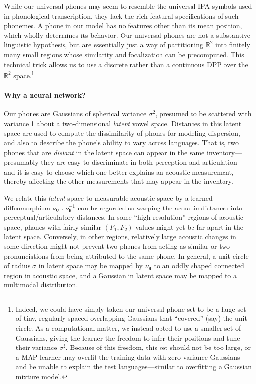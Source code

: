 \documentclass[11pt,a4paper]{article}
\newcommand{\vtheta}{{\boldsymbol \theta}}
\newcommand{\NN}{\nu_{\vtheta}}
\begin{document}
While our universal phones may seem to resemble the universal IPA
symbols used in phonological transcription, they lack the rich
featural specifications of such phonemes.  A phone in our model has no
features other than its mean position, which wholly determines its
behavior.  Our universal phones are not a substantive linguistic
hypothesis, but are essentially just a way of partitioning
$\mathbb{R}^2$ into finitely many small regions whose similarity and
focalization can be precomputed.  This technical trick allows us to
use a discrete rather than a continuous DPP over the
$\mathbb{R}^2$ space.\footnote{\label{fn:overfit}Indeed, we could have
  simply taken our universal phone set to be a huge set of tiny,
  regularly spaced overlapping Gaussians that ``covered'' (say) the
  unit circle.  As a computational matter, we instead opted to use a
  smaller set of Gaussians, giving the learner the freedom to infer
  their positions and tune their variance $\sigma^2$.  Because of this
  freedom, this set should not be too large, or a MAP learner may
  overfit the training data with zero-variance Gaussians and be unable
  to explain the test languages---similar to overfitting a Gaussian
  mixture model.}

\paragraph{Why a neural network?}
Our phones are Gaussians of spherical variance $\sigma^2$, presumed to
be scattered with variance 1 about a two-dimensional {\em latent}
vowel space.  Distances in this latent space are used to compute the
dissimilarity of phones for modeling dispersion, and also to describe
the phone's ability to vary across languages.  That is, two phones
that are {\em distant} in the latent space can appear in the same
inventory---presumably they are easy to discriminate in both
perception and articulation---and it is easy to choose which one
better explains an acoustic measurement, thereby affecting the
other measurements that may appear in the inventory.

We relate this {\em latent} space to measurable acoustic space by a
learned diffeomorphism $\NN$ \cite{cotterell-eisner:2017:ACL2017}.
$\NN^{-1}$ can be regarded as warping the acoustic distances into
perceptual/articulatory distances.  In some ``high-resolution''
regions of acoustic space, phones with fairly similar $(F_1,F_2)$
values might yet be far apart in the latent space.  Conversely, in
other regions, relatively large acoustic changes in some direction
might not prevent two phones from acting as similar or two
pronunciations from being attributed to the same phone.  In general, a
unit circle of radius $\sigma$ in latent space may be mapped by $\NN$
to an oddly shaped connected region in acoustic space, and a Gaussian
in latent space may be mapped to a multimodal distribution.
\end{document}
